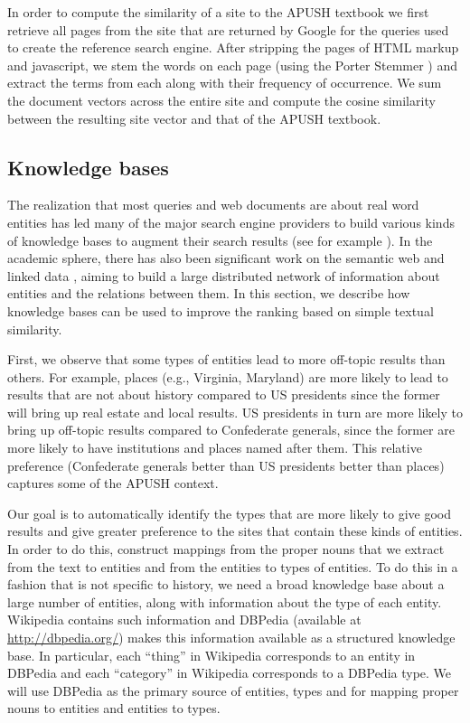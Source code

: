 \documentclass[pdfpagelabels=false,plainpages=true]{acm_proc_article-sp}
\begin{document}
In order to compute the similarity of a site to the APUSH textbook we first
retrieve all pages from the site that are returned by Google for the queries
used to create the reference search engine. After stripping the pages of HTML
markup and javascript, we stem the words on each page (using the Porter Stemmer 
\cite{porter1980algorithm}) and extract the terms from each along with their
frequency of occurrence. We sum the document vectors across the entire site and
compute the cosine similarity between the resulting site vector and that of
the APUSH textbook.

\subsection{Knowledge bases}

The realization that most queries and web documents are about real word entities
has led  many of the major search engine providers to build various kinds of knowledge
bases to augment their search results (see for example \cite{googlekg}). In the
academic sphere, there has also been significant work on the semantic
web \cite{berners2001semantic} and linked data \cite{bizer2008linked}, aiming to build a
large distributed network of information about entities and the relations
between them. In this section, we describe how knowledge bases can be
used to improve the ranking based on simple textual similarity.  

First, we observe that some types of entities lead to more off-topic results than
others. For example, places (e.g., Virginia, Maryland) are more likely to lead
to results that are not about history compared to US presidents since the former
will bring up real estate and local results. US presidents in turn are more
likely to bring up off-topic results compared to Confederate generals, since the
former are more likely to have institutions and places named after them. This
relative preference (Confederate generals better than US presidents better than
places) captures some of the APUSH context. 

Our goal is to automatically identify the types that are more likely to give
good results and give greater preference to the sites that contain these kinds
of entities. In order to do this, construct mappings from the proper nouns that
we extract from the text to entities and from the entities to types of
entities. To do this in a fashion that is not specific to history, we need a
broad knowledge base about a large number of entities, along with information
about the type of each entity. Wikipedia contains such information and DBPedia
(available at \url{http://dbpedia.org/}) makes this information available as a
structured knowledge base. In particular, each ``thing'' in Wikipedia
corresponds to an entity in DBPedia and each ``category'' in Wikipedia
corresponds to a DBPedia type. We will use DBPedia as the primary source of
entities, types and for mapping proper nouns to entities and entities to types. 
\end{document}
